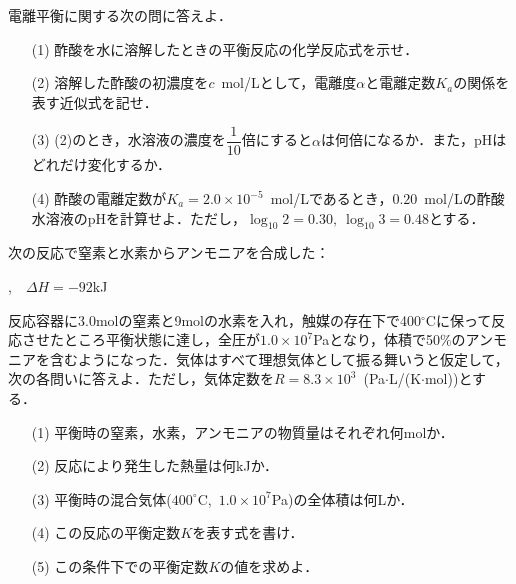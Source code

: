 \documentclass[a4paper,11pt]{ltjsarticle}
\begin{document}
\begin{que}
    電離平衡に関する次の問に答えよ．
\begin{itemize}%
    \item [(1)]酢酸を水に溶解したときの平衡反応の化学反応式を示せ．
    \item [(2)]溶解した酢酸の初濃度を$c$~mol/Lとして，電離度$\alpha$と電離定数$K_a$の関係を表す近似式を記せ．
    \item [(3)](2)のとき，水溶液の濃度を$\dfrac{1}{10}$倍にすると$\alpha$は何倍になるか．また，pHはどれだけ変化するか．
    \item [(4)]酢酸の電離定数が$K_a=2.0\times 10^{-5}$~mol/Lであるとき，$0.20$~mol/Lの酢酸水溶液のpHを計算せよ．ただし，$\log_{10}2=0.30,~\log_{10}3=0.48$とする．
\end{itemize}
\end{que}
\ans
\newpage
\begin{que}%
次の反応で窒素と水素からアンモニアを合成した：\\
\centerline{,~~$\varDelta H=-92$kJ}
反応容器に3.0molの窒素と9molの水素を入れ，触媒の存在下で400$^\circ$Cに保って反応させたところ平衡状態に達し，全圧が$1.0\times 10^7$Paとなり，体積で50$\%$のアンモニアを含むようになった．気体はすべて理想気体として振る舞いうと仮定して，次の各問いに答えよ．ただし，気体定数を$R=8.3\times 10^3$~(Pa$\cdot$L/(K$\cdot$mol))とする．
\begin{itemize}
    \item [(1)]平衡時の窒素，水素，アンモニアの物質量はそれぞれ何molか．
    \item [(2)]反応により発生した熱量は何kJか．
    \item [(3)]平衡時の混合気体($400^\circ$C,~$1.0\times 10^7$Pa)の全体積は何Lか．
    \item [(4)]この反応の平衡定数$K$を表す式を書け．
    \item [(5)]この条件下での平衡定数$K$の値を求めよ．
\end{itemize}
\end{que}
\newpage
\setcounter{page}{1}
\setcounter{quecounter}{0}
\end{document}

